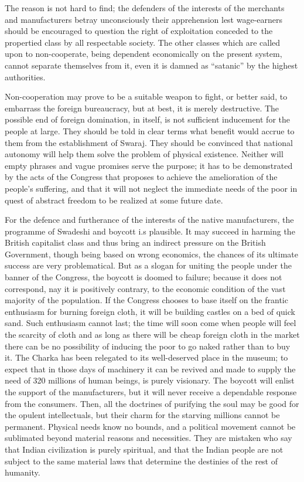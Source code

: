 The reason is not hard to find; the defenders of the interests of the merchants and manufacturers betray unconsciously their apprehension lest wage-earners should be encouraged to question the right of exploitation conceded to the propertied class by all respectable society. The other 
classes which are called upon to non-cooperate, being dependent economically on the present system, cannot separate themselves from it, even it is damned as “satanic” by the highest authorities. 

Non-cooperation may prove to be a suitable weapon to fight, or better said, to embarrass the foreign bureaucracy, but at best, it is merely destructive. The possible end of foreign domination, in itself, is not sufficient inducement for the people at large. They should be told in clear terms what benefit would accrue to them from the establishment of Swaraj. They should be convinced that national autonomy will help them solve the problem of physical existence. Neither will empty phrases and vague promises serve the purpose; it has to be demonstrated by the acts of the Congress that proposes to achieve the amelioration of the people’s suffering, and that it will not neglect the immediate needs of the poor in quest of abstract freedom to be realized at some future date. 

For the defence and furtherance of the interests of the native manufacturers, the programme of Swadeshi and boycott i.s plausible. It may succeed in harming the British capitalist class and thus bring an indirect pressure on the British Government, though being based on wrong economics, the chances of its ultimate success are very problematical. But as a slogan for uniting the people under the banner of the 
Congress, the boycott is doomed to failure; because it does not correspond, nay it is positively contrary, to the economic condition of the vast majority of the population. If the Congress chooses to base itself on the frantic enthusiasm for burning foreign cloth, it will be building castles on a bed of quick sand. Such enthusiasm cannot last; the time will soon come when people will feel the scarcity of cloth and as long as there will be cheap foreign cloth in the market there can be no possibility of inducing the poor to go naked rather than to buy it. The Charka has been relegated to its well-deserved place in the museum; to expect that in those days of machinery it can be revived and made to supply the need of 320 millions of human beings, is purely visionary. The boycott will enlist the support of the manufacturers, but it will never receive a dependable response from the consumers. Then, all the doctrines of purifying the soul may be good for the opulent intellectuals, but their charm for the starving millions cannot be permanent. Physical needs know no bounds, and a political movement cannot be sublimated beyond material reasons and necessities. They are mistaken who say that Indian civilization is purely spiritual, and that the Indian people are not subject to the same material laws that determine the destinies of the rest of humanity. 

